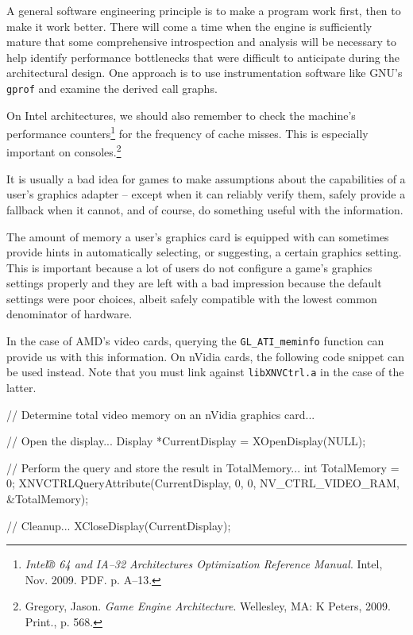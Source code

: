 A general software engineering principle is to make a program work first, then to make it work better. There will come a time when the engine is sufficiently mature that some comprehensive introspection and analysis will be necessary to help identify performance bottlenecks that were difficult to anticipate during the architectural design. One approach is to use instrumentation software like GNU's {\tt gprof} and examine the derived call graphs.

On Intel architectures, we should also remember to check the machine's performance counters\footnote{{\it Intel® 64 and IA--32 Architectures Optimization Reference Manual}. Intel, Nov. 2009. PDF. p. A--13.} for the frequency of cache misses. This is especially important on consoles.\footnote{Gregory, Jason. {\it Game Engine Architecture}. Wellesley, MA: K Peters, 2009. Print., p. 568.}

It is usually a bad idea for games to make assumptions about the capabilities of a user's graphics adapter -- except when it can reliably verify them, safely provide a fallback when it cannot, and of course, do something useful with the information. 

The amount of memory a user's graphics card is equipped with can sometimes provide hints in automatically selecting, or suggesting, a certain graphics setting. This is important because a lot of users do not configure a game's graphics settings properly and they are left with a bad impression because the default settings were poor choices, albeit safely compatible with the lowest common denominator of hardware.

In the case of AMD's video cards, querying the {\tt GL_ATI_meminfo} function can provide us with this information. On nVidia cards, the following code snippet can be used instead. Note that you must link against {\tt libXNVCtrl.a} in the case of the latter.

\startCodeExample
// Determine total video memory on an nVidia graphics card...

    // Open the display...
    Display *CurrentDisplay = XOpenDisplay(NULL);

    // Perform the query and store the result in TotalMemory...
    int TotalMemory = 0;
    XNVCTRLQueryAttribute(CurrentDisplay, 0, 0, NV_CTRL_VIDEO_RAM, &TotalMemory);
    
    // Cleanup...
    XCloseDisplay(CurrentDisplay);
\stopCodeExample

